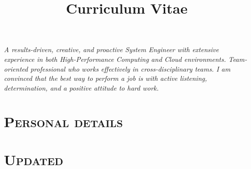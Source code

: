 \documentclass[10pt, a4paper]{moderncv}
\title{Curriculum Vitae}
\begin{document}
\maketitle

\vspace*{1em}
\center
\begin{minipage}{45em}
{\emph{
A results-driven, creative, and proactive System Engineer with extensive experience in both High-Performance Computing and Cloud environments. Team-oriented professional who works effectively in cross-disciplinary teams. I am convinced that the best way to perform a job is with active listening, determination, and a positive attitude to hard work. 
}}
\end{minipage}
\vspace*{2em}

\section{\textsc{Personal details}}
\closesection






\vspace*{\fill}
\section{\textsc{Updated}}
\closesection{}
\end{document}
